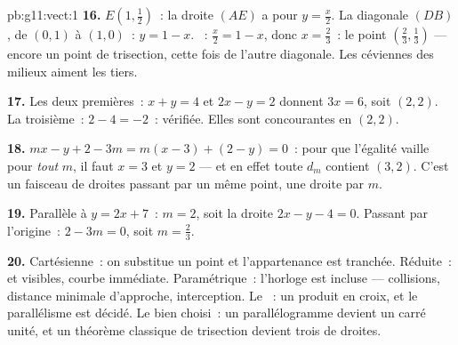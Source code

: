 \begin{solution}{pb:g11:vect:1}
\textbf{16.} $E\left(1, \frac12\right)$~: la droite $(AE)$ a pour
 $y = \frac x2$. La diagonale $(DB)$, de $(0,1)$ à
$(1,0)$~: $y = 1 - x$. ~: $\frac x2 = 1 - x$, donc
$x = \frac23$~: le point $\left(\frac23, \frac13\right)$ --- encore
un point de trisection, cette fois de l'autre diagonale. Les
céviennes des milieux aiment les tiers.

\textbf{17.} Les deux premières~: $x + y = 4$ et $2x - y = 2$
donnent $3x = 6$, soit $(2, 2)$. La troisième~: $2 - 4 = -2$~:
vérifiée. Elles sont concourantes en $(2, 2)$.

\textbf{18.} $mx - y + 2 - 3m = m(x - 3) + (2 - y) = 0$~: pour que
l'égalité vaille pour \emph{tout} $m$, il faut $x = 3$ et $y = 2$
--- et en effet toute $d_m$ contient $(3, 2)$. C'est un faisceau de
droites passant par un même point, une droite par  $m$.

\textbf{19.} Parallèle à $y = 2x + 7$~: 
$m = 2$, soit la droite $2x - y - 4 = 0$. Passant par l'origine~:
$2 - 3m = 0$, soit $m = \frac23$.

\textbf{20.} Cartésienne~: on substitue un point et l'appartenance
est tranchée. Réduite~:  et  visibles, courbe immédiate. Paramétrique~: l'horloge est
incluse --- collisions, distance minimale d'approche, interception.
Le ~: un produit en croix, et le parallélisme est décidé.
Le  bien choisi~: un parallélogramme devient un carré unité,
et un théorème classique de trisection devient trois 
de droites.
\end{solution}
